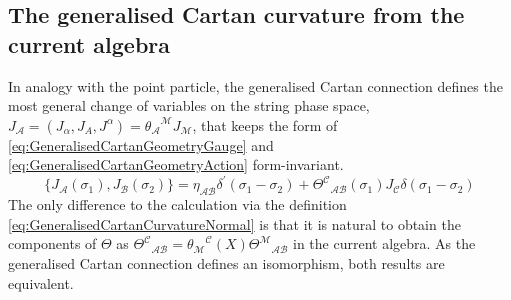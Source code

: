 \documentclass[11pt,a4paper]{article}
\numberwithin{equation}{section}
\begin{document}

\subsection{The generalised Cartan curvature from the current algebra} \label{chap:GeneralisedCartanGeometryCurvature}
In analogy with the point particle, the generalised Cartan connection defines the most general change of variables on the string phase space, $
J_\mathcal{A}= (J_\alpha , J_A , J^\alpha) = {\theta_\mathcal{A}}^{\mathcal{M}} J_\mathcal{M}$, that keeps the form of \eqref{eq:GeneralisedCartanGeometryGauge} and \eqref{eq:GeneralisedCartanGeometryAction} form-invariant. 
\begin{equation}
    \{ J_\mathcal{A}(\sigma_1) , J_\mathcal{B}(\sigma_2) \} = \eta_{\mathcal{AB}} \delta^\prime(\sigma_1 - \sigma_2) + {\Theta^\mathcal{C}}_{\mathcal{AB}}(\sigma_1) J_\mathcal{C}\delta(\sigma_1 - \sigma_2) \label{eq:GeneralisedCartanCurvatureCurrent}
\end{equation}
The only difference to the calculation via the definition \eqref{eq:GeneralisedCartanCurvatureNormal} is that it is natural to obtain the components of $\Theta$ as ${\Theta^\mathcal{C}}_{\mathcal{AB}} = {\theta_\mathcal{M}}^\mathcal{C}(X) {\Theta^\mathcal{M}}_{\mathcal{AB}}$ in the current algebra. As the generalised Cartan connection defines an isomorphism, both results are equivalent.
\end{document}
